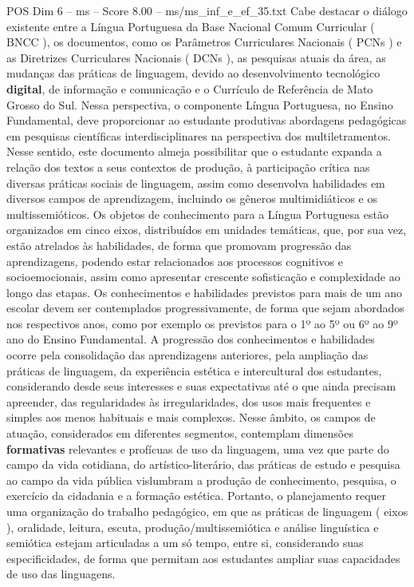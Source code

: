 \begin{textsample}{POS Dim 6 – ms – Score 8.00 – ms/ms\_inf\_e\_ef\_35.txt}
Cabe destacar o diálogo existente entre a Língua Portuguesa da Base Nacional Comum Curricular ( BNCC ), os documentos, como os Parâmetros Curriculares Nacionais ( PCNs ) e as Diretrizes Curriculares Nacionais ( DCNs ), as pesquisas atuais da área, as mudanças das práticas de linguagem, devido ao desenvolvimento tecnológico \textbf{digital}, de informação e comunicação e o Currículo de Referência de Mato Grosso do Sul.
Nessa perspectiva, o componente Língua Portuguesa, no Ensino Fundamental, deve proporcionar ao estudante produtivas abordagens pedagógicas em pesquisas científicas interdisciplinares na perspectiva dos multiletramentos.
Nesse sentido, este documento almeja possibilitar que o estudante expanda a relação dos textos a seus contextos de produção, à participação crítica nas diversas práticas sociais de linguagem, assim como desenvolva habilidades em diversos campos de aprendizagem, incluindo os gêneros multimidiáticos e os multissemióticos.
Os objetos de conhecimento para a Língua Portuguesa estão organizados em cinco eixos, distribuídos em unidades temáticas, que, por sua vez, estão atrelados às habilidades, de forma que promovam progressão das aprendizagens, podendo estar relacionados aos processos cognitivos e socioemocionais, assim como apresentar crescente sofisticação e complexidade ao longo das etapas.
Os conhecimentos e habilidades previstos para mais de um ano escolar devem ser contemplados progressivamente, de forma que sejam abordados nos respectivos anos, como por exemplo os previstos para o 1º ao 5º ou 6º ao 9º ano do Ensino Fundamental.
A progressão dos conhecimentos e habilidades ocorre pela consolidação das aprendizagens anteriores, pela ampliação das práticas de linguagem, da experiência estética e intercultural dos estudantes, considerando desde seus interesses e suas expectativas até o que ainda precisam apreender, das regularidades às irregularidades, dos usos mais frequentes e simples aos menos habituais e mais complexos.
Nesse âmbito, os campos de atuação, considerados em diferentes segmentos, contemplam dimensões \textbf{formativas} relevantes e profícuas de uso da linguagem, uma vez que parte do campo da vida cotidiana, do artístico-literário, das práticas de estudo e pesquisa ao campo da vida pública vislumbram a produção de conhecimento, pesquisa, o exercício da cidadania e a formação estética.
Portanto, o planejamento requer uma organização do trabalho pedagógico, em que as práticas de linguagem ( eixos ), oralidade, leitura, escuta, produção/multissemiótica e análise linguística e semiótica estejam articuladas a um só tempo, entre si, considerando suas especificidades, de forma que permitam aos estudantes ampliar suas capacidades de uso das linguagens.

\end{textsample}
